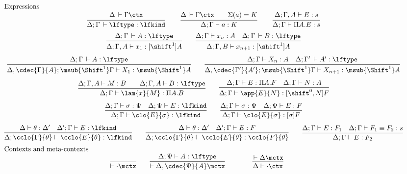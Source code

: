 \documentclass[copyright,creativecommons]{eptcs}
\makeatletter
\newcommand{\der}{\,\vdash}
\newcommand{\ru}[2]{\dfrac{\begin{array}[b]{@{}c@{}} #1 \end{array}}{#2}}
\newcommand{\cxt}{\ctx}  \newcommand{\mcxt}{\mctx}
\newcommand{\shiftby}[1]{\shift^{#1}}
\newcommand{\Shiftby}[1]{\Shift^{#1}}
\newcommand{\esub}[1]{[#1]}
\makeatother
\begin{document}
\begin{figure}[htbp]
\centering
\[
\begin{array}{c}
\multicolumn{1}{l}{\mbox{Expressions }}\\\ru{\Delta \der \Gamma \cxt
  }{\Delta; \Gamma \der \lftype : \lfkind}
\qquad
\ru{\Delta \der \Gamma \cxt \qquad \Sigma(a) = K
  }{\Delta; \Gamma \vdash a : K}
\qquad
\ru{\Delta; \Gamma, A \vdash E : s
  }{\Delta;\Gamma \vdash \Pi A.E : s}
\\[1.25em]
\infer{\Delta; \Gamma, A \vdash x_1 : \esub {\shiftby 1} A}
      {\Delta; \Gamma \der A : \lftype}
\qquad
\infer{\Delta; \Gamma, B \vdash x_{n+1} : [\shift^1]A}
      {\Delta; \Gamma \vdash x_n : A & \Delta; \Gamma \der B : \lftype} 
\\[0.75em]
\infer{\Delta, \cdec{\Gamma}{A} ; \msub{\Shiftby 1}\Gamma 
         \vdash X_1 : \msub {\Shiftby 1} A}
      {\Delta; \Gamma \der A : \lftype}
\qquad
\infer{\Delta, \cdec{\Gamma'}{A'} ; \msub{\Shift^1}\Gamma \vdash
  X_{n+1} : \msub{\Shift^1}A}
      {\Delta; \Gamma \vdash X_n : A & \Delta; \Gamma' \der A' : \lftype}
\\[0.75em]
\infer{\Delta; \Gamma \vdash \lam{x}{M} : \Pi A. B}
      {\Delta; \Gamma, A \vdash  M : B \qquad
       \Delta; \Gamma, A \vdash B : \lftype}
\qquad
\infer{\Delta; \Gamma \vdash \app{E}{N} : [\shift^0, N]F}
       {\Delta; \Gamma \vdash E : \Pi A.F
        &
        \Delta; \Gamma \vdash  N : A}
\\[0.75em]
\infer{\Delta; \Gamma \vdash \clo{E}{\sigma} : \lfkind}
      {\Delta; \Gamma \vdash \sigma : \Psi & \Delta; \Psi \vdash E : \lfkind 
      }
\qquad 
\infer{\Delta; \Gamma \vdash \clo{E}{\sigma} : [\sigma]F}
      {\Delta; \Gamma \vdash \sigma : \Psi & \Delta; \Psi \vdash E : F 
      }
\\[0.75em]
\infer{\Delta; \cclo{\Gamma}{\theta} \vdash \cclo{E}{\theta} : \lfkind}
{\Delta \vdash \theta : \Delta' & 
 \Delta' ; \Gamma \vdash E : \lfkind}
\qquad 
\infer{\Delta; \cclo{\Gamma}{\theta} \vdash \cclo{E}{\theta} : \cclo{F}{\theta}}
{\Delta \vdash \theta : \Delta' & 
 \Delta' ; \Gamma \vdash E : F}
\qquad
\infer{\Delta; \Gamma \vdash E : F_2}{
\Delta; \Gamma \vdash E : F_1 & \Delta; \Gamma \vdash F_1 \equiv F_2 : s
}
\\[0.5em]
\multicolumn{1}{l}{\mbox{Contexts and meta-contexts}}\\\infer{\vdash \cdot \mctx } {}
\qquad
\infer{\vdash \Delta, \cdec{\Psi}{A} \mctx}{
\Delta; \Psi \vdash A : \lftype
}  
\qquad\qquad
\infer{\Delta \vdash \cdot \ctx}{\der \Delta \mcxt}
\qquad

\end{array}\]
\end{figure}
\end{document}

